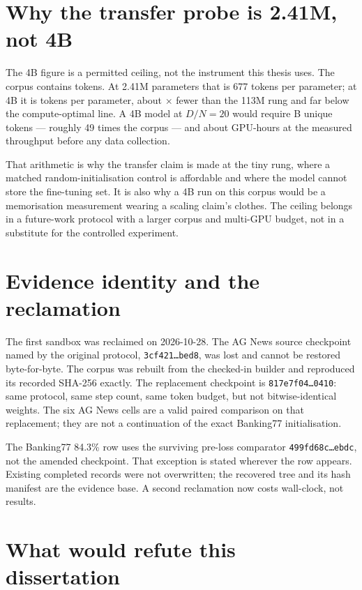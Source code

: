 \section{Why the transfer probe is 2.41M, not 4B}

The 4B figure is a permitted ceiling, not the instrument this thesis uses. The
corpus contains \CorpusTokens{} tokens. At 2.41M parameters that is 677 tokens per
parameter; at 4B it is \FourBDN{} tokens per parameter, about
\FourBFactor$\times$ fewer than the 113M rung and far below the compute-optimal
line. A 4B model at $D/N=20$ would require \FourBTokensB{}B unique tokens ---
roughly 49 times the corpus --- and about \FourBGPUHours{} GPU-hours at the
measured throughput before any data collection.

That arithmetic is why the transfer claim is made at the tiny rung, where a
matched random-initialisation control is affordable and where the model cannot
store the fine-tuning set. It is also why a 4B run on this corpus would be a
memorisation measurement wearing a scaling claim's clothes. The ceiling belongs in
a future-work protocol with a larger corpus and multi-GPU budget, not in a
substitute for the controlled experiment.

\section{Evidence identity and the reclamation}

The first sandbox was reclaimed on 2026-10-28. The AG News source checkpoint named
by the original protocol, \texttt{3cf421\ldots bed8}, was lost and cannot be
restored byte-for-byte. The corpus was rebuilt from the checked-in builder and
reproduced its recorded SHA-256 exactly. The replacement checkpoint is
\texttt{817e7f04\ldots0410}: same protocol, same step count, same token budget, but
not bitwise-identical weights. The six AG News cells are a valid paired comparison
on that replacement; they are not a continuation of the exact Banking77
initialisation.

The Banking77 84.3\% row uses the surviving pre-loss comparator
\texttt{499fd68c\ldots ebdc}, not the amended checkpoint. That exception is stated
wherever the row appears. Existing completed records were not overwritten; the
recovered tree and its hash manifest are the evidence base. A second reclamation
now costs wall-clock, not results.

\section{What would refute this dissertation}


